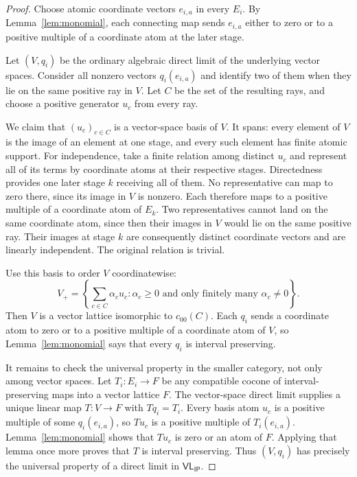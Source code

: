 \documentclass[11pt,a4paper]{article}
\newcommand{\VLIP}{\mathsf{VL}_{\mathsf{IP}}}
\begin{document}
\begin{proof}
Choose atomic coordinate vectors $e_{i,a}$ in every $E_i$.  By
Lemma~\ref{lem:monomial}, each connecting map sends $e_{i,a}$ either to zero
or to a positive multiple of a coordinate atom at the later stage.

Let $(V,q_i)$ be the ordinary algebraic direct limit of the underlying vector
spaces.  Consider all nonzero vectors $q_i(e_{i,a})$ and identify two of them
when they lie on the same positive ray in $V$.  Let $C$ be the set of the
resulting rays, and choose a positive generator $u_c$ from every ray.

We claim that $(u_c)_{c\in C}$ is a vector-space basis of $V$.  It spans:
every element of $V$ is the image of an element at one stage, and every such
element has finite atomic support.  For independence, take a finite relation
among distinct $u_c$ and represent all of its terms by coordinate atoms at
their respective stages.  Directedness provides one later stage $k$ receiving
all of them.  No representative can map to zero there, since its image in
$V$ is nonzero.  Each therefore maps to a positive multiple of a coordinate
atom of $E_k$.  Two representatives cannot land on the same coordinate atom,
since then their images in $V$ would lie on the same positive ray.  Their
images at stage $k$ are consequently distinct coordinate vectors and are
linearly independent.  The original relation is trivial.

Use this basis to order $V$ coordinatewise:
\[
 V_+=\left\{\sum_{c\in C}\alpha_cu_c:
        \alpha_c\geq0\text{ and only finitely many }\alpha_c\ne0\right\}.
\]
Then $V$ is a vector lattice isomorphic to $c_{00}(C)$.  Each $q_i$ sends a
coordinate atom to zero or to a positive multiple of a coordinate atom of
$V$, so Lemma~\ref{lem:monomial} says that every $q_i$ is interval preserving.

It remains to check the universal property in the smaller category, not only
among vector spaces.  Let $T_i:E_i\to F$ be any compatible cocone of
interval-preserving maps into a vector lattice $F$.  The vector-space direct
limit supplies a unique linear map $T:V\to F$ with $Tq_i=T_i$.  Every basis
atom $u_c$ is a positive multiple of some $q_i(e_{i,a})$, so $Tu_c$ is a
positive multiple of $T_i(e_{i,a})$.  Lemma~\ref{lem:monomial} shows that
$Tu_c$ is zero or an atom of $F$.  Applying that lemma once more proves that
$T$ is interval preserving.  Thus $(V,q_i)$ has precisely the universal
property of a direct limit in $\VLIP$.
\end{proof}
\end{document}
